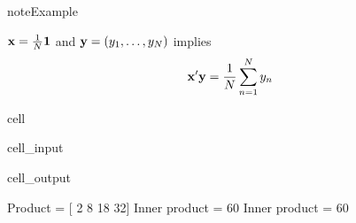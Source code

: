 \documentclass[letterpaper,10pt,english]{jupyterBook}
\begin{document}
\begin{sphinxadmonition}{note}{Example}

\sphinxAtStartPar
\({\bf x} = \tfrac{1}{N} {\bf 1}\) and \({\bf y} = (y_1, \ldots, y_N)\) implies
\begin{equation*}
\begin{split}
%
{\bf x}' {\bf y} 
= \frac{1}{N} \sum_{n=1}^N y_n
%
\end{split}
\end{equation*}\end{sphinxadmonition}

\begin{sphinxuseclass}{cell}\begin{sphinxVerbatimInput}

\begin{sphinxuseclass}{cell_input}
\begin{sphinxVerbatim}[commandchars=\\\{\}]
   
     
     
  
  
  
\end{sphinxVerbatim}

\end{sphinxuseclass}\end{sphinxVerbatimInput}
\begin{sphinxVerbatimOutput}

\begin{sphinxuseclass}{cell_output}
\begin{sphinxVerbatim}[commandchars=\\\{\}]
Product = [ 2  8 18 32]
Inner product = 60
Inner product = 60
\end{sphinxVerbatim}

\end{sphinxuseclass}\end{sphinxVerbatimOutput}

\end{sphinxuseclass}
\end{document}
